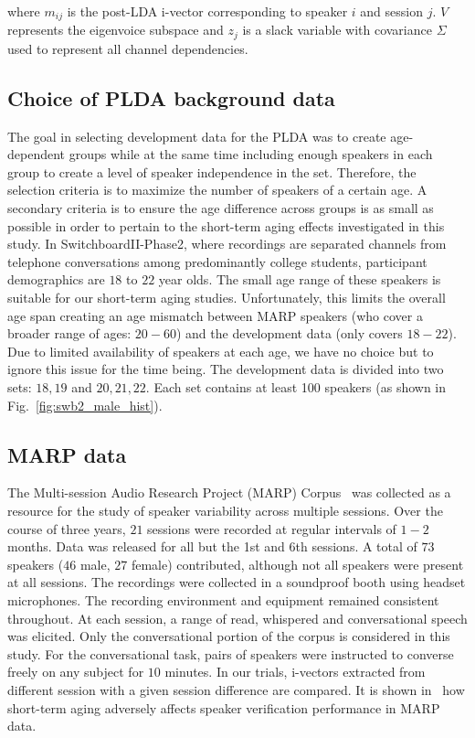 \documentclass[a4paper]{article}
\begin{document}
where $m_{ij}$ is the post-LDA i-vector corresponding to speaker $i$ and session $j$. $V$ represents the eigenvoice subspace and $z_j$ is a slack variable with covariance $\Sigma$ used to represent all channel dependencies. 

\subsection{Choice of PLDA background data}
The goal in selecting development data for the PLDA was to create age-dependent groups while at the same time including enough speakers in each group to create a level of speaker independence in the set. Therefore, the selection criteria is to maximize the number of speakers of a certain age. A secondary criteria is to ensure the age difference across groups is as small as possible in order to pertain to the short-term aging effects investigated in this study. In SwitchboardII-Phase2, where recordings are separated channels from telephone conversations among predominantly college students, participant demographics are $18$ to $22$ year olds. The small age range of these speakers is suitable for our short-term aging studies. Unfortunately, this limits the overall age span creating an age mismatch between MARP speakers (who cover a broader range of ages: $20-60$) and the development data (only covers $18-22$). Due to limited availability of speakers at each age, we have no choice but to ignore this issue for the time being. The development data is divided into two sets: $18,19$ and $20,21,22$. Each set contains at least 100 speakers (as shown in Fig.~\ref{fig:swb2_male_hist}). 
 
\subsection{MARP data}
The Multi-session Audio Research Project (MARP) Corpus~\cite{paper12} was collected as a resource for the study of speaker variability across multiple sessions. Over the course of three years, $21$ sessions were recorded at regular intervals of $1-2$ months. Data was released for all but the 1st and 6th sessions. A total of $73$ speakers ($46$ male, $27$ female) contributed, although not all speakers were present at all sessions. The recordings were collected in a soundproof booth using headset microphones. The recording environment and equipment remained consistent throughout. At each session, a range of read, whispered and conversational speech was elicited. Only the conversational portion of the corpus is considered in this study. For the conversational task, pairs of speakers were instructed to converse freely on any subject for $10$ minutes. In our trials, i-vectors extracted from different session with a given session difference are compared. It is shown in~\cite{kellyinterspeech15} how short-term aging adversely affects speaker verification performance in MARP data. 
\end{document}
